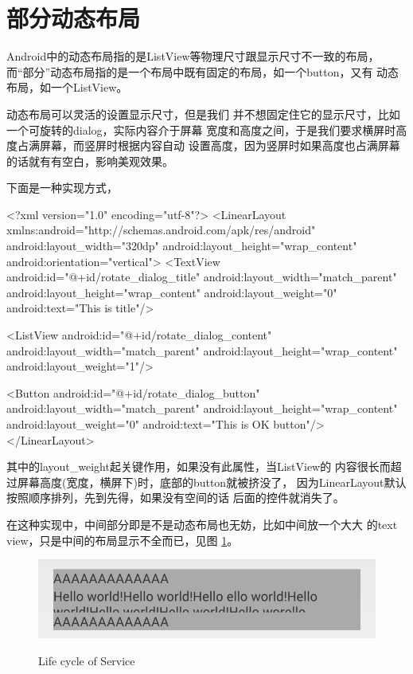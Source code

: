 \section[部分动态布局]{部分动态布局}
Android中的动态布局指的是ListView等物理尺寸跟显示尺寸不一致的布局，
而“部分”动态布局指的是一个布局中既有固定的布局，如一个button，又有
动态布局，如一个ListView。

动态布局可以灵活的设置显示尺寸，但是我们
并不想固定住它的显示尺寸，比如一个可旋转的dialog，实际内容介于屏幕
宽度和高度之间，于是我们要求横屏时高度占满屏幕，而竖屏时根据内容自动
设置高度，因为竖屏时如果高度也占满屏幕的话就有有空白，影响美观效果。

下面是一种实现方式，

\begin{xmlcode}
<?xml version="1.0" encoding="utf-8"?>
<LinearLayout
  xmlns:android="http://schemas.android.com/apk/res/android"
  android:layout_width="320dp"
  android:layout_height="wrap_content"
  android:orientation="vertical">
  <TextView
    android:id="@+id/rotate_dialog_title"
    android:layout_width="match_parent"
    android:layout_height="wrap_content"
    android:layout_weight="0"
    android:text="This is title"/>
    
  <ListView
    android:id="@+id/rotate_dialog_content"
    android:layout_width="match_parent"
    android:layout_height="wrap_content"
    android:layout_weight="1"/>

  <Button
    android:id="@+id/rotate_dialog_button"
    android:layout_width="match_parent"
    android:layout_height="wrap_content"
    android:layout_weight="0"
    android:text="This is OK button"/>
</LinearLayout>
\end{xmlcode}

其中的layout\_weight起关键作用，如果没有此属性，当ListView的
内容很长而超过屏幕高度(宽度，横屏下)时，底部的button就被挤没了，
因为LinearLayout默认按照顺序排列，先到先得，如果没有空间的话
后面的控件就消失了。

在这种实现中，中间部分即是不是动态布局也无妨，比如中间放一个大大
的text view，只是中间的布局显示不全而已，见图 \ref{fig:dynamic}。
\begin{figure}[ht]
  \centering
  \includegraphics[width=.7\textwidth]{picturedir/dynamic_layout.png}\\
  \caption{Life cycle of Service}\label{fig:dynamic}
\end{figure}
